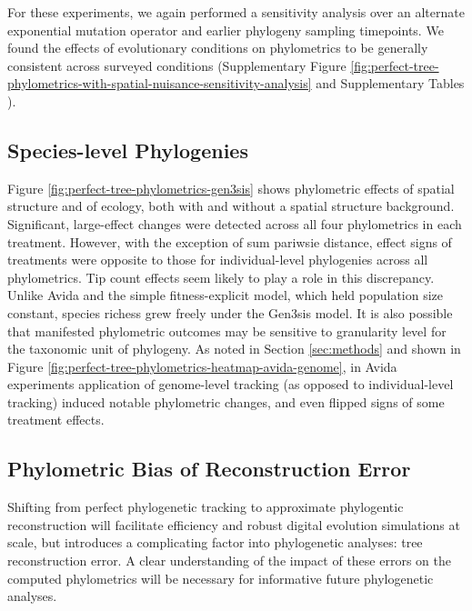 For these experiments, we again performed a sensitivity analysis over an alternate exponential mutation operator and earlier phylogeny sampling timepoints.
We found the effects of evolutionary conditions on phylometrics to be generally consistent across surveyed conditions (Supplementary Figure \ref{fig:perfect-tree-phylometrics-with-spatial-nuisance-sensitivity-analysis} and Supplementary Tables ).

\subsection{Species-level Phylogenies}




Figure \ref{fig:perfect-tree-phylometrics-gen3sis} shows phylometric effects of spatial structure and of ecology, both with and without a spatial structure background.
Significant, large-effect changes were detected across all four phylometrics in each treatment.
However, with the exception of sum pariwsie distance, effect signs of treatments were opposite to those for individual-level phylogenies across all phylometrics.
Tip count effects seem likely to play a role in this discrepancy.
Unlike Avida and the simple fitness-explicit model, which held population size constant, species richess grew freely under the Gen3sis model.
It is also possible that manifested phylometric outcomes may be sensitive to granularity level for the taxonomic unit of phylogeny.
As noted in Section \ref{sec:methods} and shown in Figure \ref{fig:perfect-tree-phylometrics-heatmap-avida-genome}, in Avida experiments application of genome-level tracking (as opposed to individual-level tracking) induced notable phylometric changes, and even flipped signs of some treatment effects.

\subsection{Phylometric Bias of Reconstruction Error}
\label{sec:phylometric-bias-reconstruction-error}

Shifting from perfect phylogenetic tracking to approximate phylogentic reconstruction will facilitate efficiency and robust digital evolution simulations at scale, but introduces a complicating factor into phylogenetic analyses: tree reconstruction error.
A clear understanding of the impact of these errors on the computed phylometrics will be necessary for informative future phylogenetic analyses.

